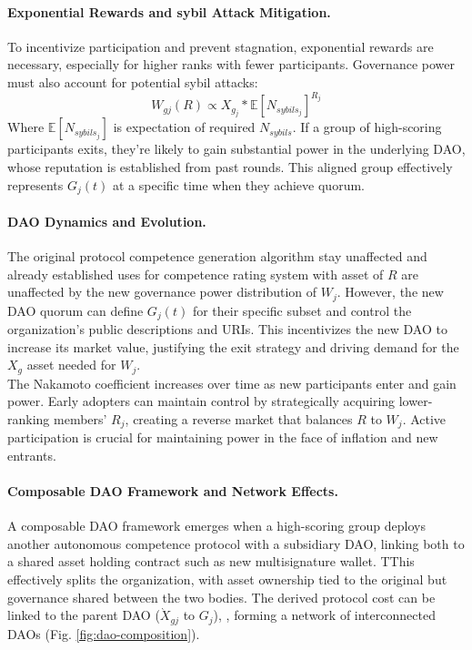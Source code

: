 \documentclass{article}
\begin{document}
\begin{CJK}{UTF8}{gbsn}
\begin{multicols}{2}
            \paragraph{Exponential Rewards and sybil Attack Mitigation.}
            To incentivize participation and prevent stagnation, exponential rewards are necessary, especially for higher ranks with fewer participants. Governance power must also account for potential sybil attacks:
            \begin{equation}
                W_{gj}(R) \propto  X_{g_j}*\mathbb{E}[N_{sybils_j}]^{R_j}
            \end{equation}
            Where $\mathbb{E}[N_{sybils_j}]$ is expectation of required $N_{sybils}$. If a group of high-scoring participants exits, they're likely to gain substantial power in the underlying DAO, whose reputation is established from past rounds. This aligned group effectively represents $G_j(t)$  at a specific time when they achieve quorum.

            \paragraph{DAO Dynamics and Evolution.} The original protocol competence generation algorithm stay unaffected and already established uses for competence rating system with asset of $R$ are unaffected by the new governance power distribution of $W_j$. However, the new DAO quorum can define $G_j(t)$ for their specific subset and control the organization's public descriptions and URIs. This incentivizes the new DAO to increase its market value, justifying the exit strategy and driving demand for the $X_g$ asset needed for $W_j$.\\
            The Nakamoto coefficient increases over time as new participants enter and gain power. Early adopters can maintain control by strategically acquiring lower-ranking members' $R_{j}$, creating a reverse market that balances $R$ to $W_j$. Active participation is crucial for maintaining power in the face of inflation and new entrants.
            \paragraph{Composable DAO Framework and Network Effects.}
            A composable DAO framework emerges when a high-scoring group deploys another autonomous competence protocol with a subsidiary DAO, linking both to a shared asset holding contract such as new multisignature wallet. TThis effectively splits the organization, with asset ownership tied to the original but governance shared between the two bodies. The derived protocol cost can be linked to the parent DAO ($ \grave{X}_{gj}$ to $G_j$), , forming a network of interconnected DAOs (Fig. \ref{fig:dao-composition}).




\end{multicols}
\end{CJK}
\end{document}
